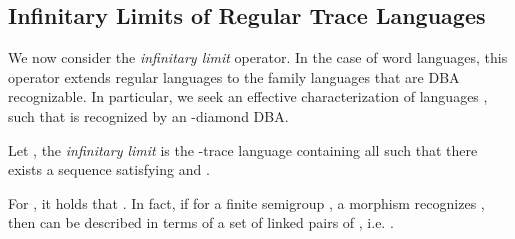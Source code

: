 \subsection{Infinitary Limits of Regular Trace Languages} \label{subsec:sLanguages}

We now consider the \emph{infinitary limit} operator. In the case of word languages, this operator extends regular languages to the family \omReg languages that are DBA recognizable. In particular, we seek an effective characterization of languages , such that  is recognized by an -diamond DBA.

\begin{definition}\label{def:limT}
 Let , the \emph{infinitary limit}  is the -trace language containing all   such that there exists a sequence  satisfying  and .
\end{definition}

\begin{remark}
For , it holds that . In fact, if for a finite semigroup , a morphism  recognizes , then  can be described in terms of a set  of linked pairs of , i.e. .
\hfill
\end{remark}


